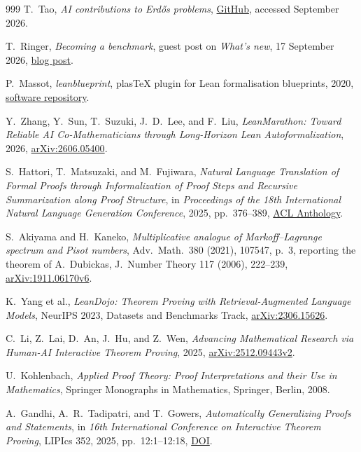 \documentclass[10pt]{article}
\begin{document}
\begin{thebibliography}{999}
 T.~Tao, \emph{AI contributions to Erd\H{o}s problems},
\href{https://github.com/teorth/erdosproblems/wiki/AI-contributions-to-Erd%C5%91s-problems}{GitHub},
accessed September 2026.

 T.~Ringer, \emph{Becoming a benchmark}, guest post on
\emph{What's new}, 17 September 2026,
\href{https://terrytao.wordpress.com/2026/09/17/becoming-a-benchmark/}{blog post}.

 P.~Massot, \emph{leanblueprint}, plasTeX plugin for
Lean formalisation blueprints, 2020,
\href{https://github.com/PatrickMassot/leanblueprint}{software repository}.

 Y.~Zhang, Y.~Sun, T.~Suzuki, J.~D.~Lee, and F.~Liu,
\emph{LeanMarathon: Toward Reliable AI Co-Mathematicians through Long-Horizon
Lean Autoformalization}, 2026,
\href{https://arxiv.org/abs/2606.05400}{arXiv:2606.05400}.

 S.~Hattori, T.~Matsuzaki, and M.~Fujiwara, \emph{Natural
Language Translation of Formal Proofs through Informalization of Proof Steps
and Recursive Summarization along Proof Structure}, in \emph{Proceedings of
the 18th International Natural Language Generation Conference}, 2025,
pp.~376--389, \href{https://aclanthology.org/2025.inlg-main.23/}{ACL Anthology}.

 S.~Akiyama and H.~Kaneko, \emph{Multiplicative analogue
of Markoff--Lagrange spectrum and Pisot numbers}, Adv.\ Math.\ 380 (2021),
107547, p.~3, reporting the
theorem of A.~Dubickas, J.\ Number Theory 117 (2006), 222--239,
\href{https://arxiv.org/abs/1911.06170v6}{arXiv:1911.06170v6}.

 K.~Yang et al., \emph{LeanDojo: Theorem Proving with
Retrieval-Augmented Language Models}, NeurIPS 2023, Datasets and Benchmarks
Track, \href{https://arxiv.org/abs/2306.15626}{arXiv:2306.15626}.

 C.~Li, Z.~Lai, D.~An, J.~Hu, and Z.~Wen, \emph{Advancing
Mathematical Research via Human-AI Interactive Theorem Proving}, 2025,
\href{https://arxiv.org/abs/2512.09443v2}{arXiv:2512.09443v2}.

 U.~Kohlenbach, \emph{Applied Proof Theory: Proof
Interpretations and their Use in Mathematics}, Springer Monographs in
Mathematics, Springer, Berlin, 2008.

 A.~Gandhi, A.~R.~Tadipatri, and T.~Gowers,
\emph{Automatically Generalizing Proofs and Statements}, in \emph{16th
International Conference on Interactive Theorem Proving}, LIPIcs 352, 2025,
pp.~12:1--12:18, \href{https://doi.org/10.4230/LIPIcs.ITP.2025.12}{DOI}.


\end{thebibliography}
\end{document}
